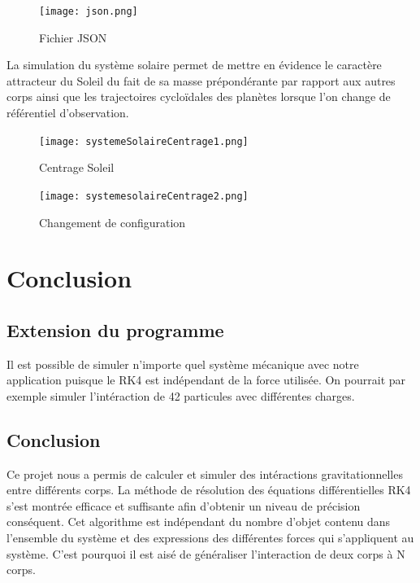 \documentclass[a4paper, 12pt]{article}
\begin{document}
	\begin{figure}[H]
		\centering
		\texttt{[image: json.png]}
		\caption{\label{fig: json} Fichier JSON}  
	\end{figure}
	

La simulation du système solaire permet de mettre en évidence le caractère attracteur du Soleil du fait de sa masse prépondérante par rapport aux autres corps ainsi que les trajectoires cycloïdales des planètes lorsque l'on change de référentiel d'observation.
	\begin{figure}[H]
    	\centering
    	\begin{minipage}{0.3\linewidth}
        	\centering
        	\texttt{[image: systemeSolaireCentrage1.png]}
        	\caption{\label{fig:systsolaire1} Centrage Soleil}
    	\end{minipage}
    	\hspace{0.05\linewidth}  %
    	\begin{minipage}{0.27\linewidth}
        	\centering
        	\texttt{[image: systemesolaireCentrage2.png]}
        	\caption{\label{fig:systsolaire2} Changement de configuration} 
    	\end{minipage}
	\end{figure} 

\section{Conclusion}
\subsection{Extension du programme}
Il est possible de simuler n'importe quel système mécanique avec notre application puisque le RK4 est indépendant de la force utilisée. On pourrait par exemple simuler l'intéraction de 42 particules avec différentes charges.

\subsection{Conclusion}
Ce projet nous a permis de calculer et simuler des intéractions gravitationnelles entre différents corps. 
La méthode de résolution des équations différentielles RK4 s’est montrée efficace et suffisante afin d’obtenir un niveau de précision conséquent. 
Cet algorithme est indépendant du nombre d’objet contenu dans l’ensemble du système et des expressions des différentes forces qui s'appliquent au système. C’est pourquoi il est aisé de généraliser l’interaction de deux corps à N corps.\\
\end{document}
